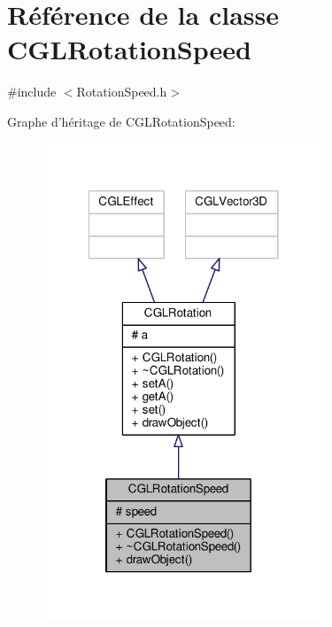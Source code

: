 \hypertarget{class_c_g_l_rotation_speed}{\section{Référence de la classe C\-G\-L\-Rotation\-Speed}
\label{class_c_g_l_rotation_speed}
}


{\ttfamily \#include $<$Rotation\-Speed.\-h$>$}



Graphe d'héritage de C\-G\-L\-Rotation\-Speed\-:
\nopagebreak
\begin{figure}[H]
\begin{center}
\leavevmode
\includegraphics[width=239pt]{d0/dbb/class_c_g_l_rotation_speed__inherit__graph}
\end{center}
\end{figure}


